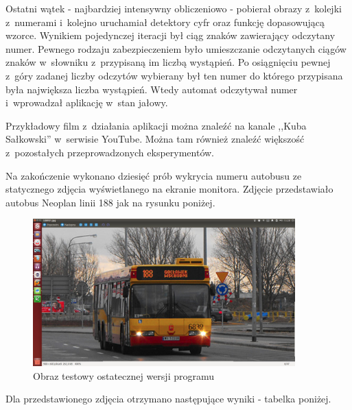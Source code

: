 Ostatni wątek - najbardziej intensywny obliczeniowo - pobierał obrazy
z~kolejki z~numerami i~kolejno uruchamiał detektory cyfr oraz 
funkcję dopasowującą wzorce. Wynikiem pojedynczej iteracji był 
ciąg znaków zawierający odczytany numer. Pewnego rodzaju zabezpieczeniem
było umieszczanie odczytanych ciągów znaków w~słowniku z~przypisaną
im liczbą wystąpień. Po osiągnięciu pewnej z~góry zadanej liczby
odczytów wybierany był ten numer do którego przypisana była największa 
liczba wystąpień. Wtedy automat odczytywał numer i~wprowadzał 
aplikację w~stan jałowy.

Przykładowy film z~działania aplikacji można znaleźć na kanale
,,Kuba Sałkowski'' w~serwisie YouTube. Można tam również znaleźć 
większość z~pozostałych przeprowadzonych eksperymentów.

Na zakończenie wykonano dziesięć prób wykrycia numeru autobusu
ze statycznego zdjęcia wyświetlanego na ekranie monitora.
Zdjęcie przedstawiało autobus Neoplan linii 188 jak na rysunku poniżej.

\begin{figure}[h!]
    \caption{Obraz testowy ostatecznej wersji programu}
    \centering
    \includegraphics[width=0.9\textwidth]{img/imp_final_test_img}
\end{figure}

Dla przedstawionego zdjęcia otrzymano następujące wyniki - tabelka
poniżej.

